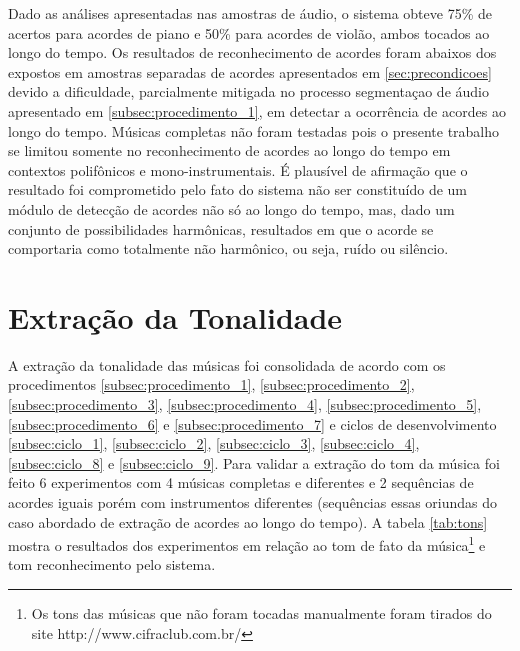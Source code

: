 Dado as análises apresentadas nas amostras de áudio, o sistema obteve 75\% de acertos para acordes de piano e 50\% para acordes de violão, ambos tocados ao longo do tempo. Os resultados de reconhecimento de acordes foram abaixos dos expostos em amostras separadas de acordes apresentados em \ref{sec:precondicoes} devido a dificuldade, parcialmente mitigada no processo segmentaçao de áudio apresentado em \ref{subsec:procedimento_1}, em detectar a ocorrência de acordes ao longo do tempo. Músicas completas não foram testadas pois o presente trabalho se limitou somente no reconhecimento de acordes ao longo do tempo em contextos polifônicos e mono-instrumentais. É plausível de afirmação que o resultado foi comprometido pelo fato do sistema não ser constituído de um módulo de detecção de acordes não só ao longo do tempo, mas, dado um conjunto de possibilidades harmônicas, resultados em que o acorde se comportaria como totalmente não harmônico, ou seja, ruído ou silêncio.

\section{Extração da Tonalidade}

A extração da tonalidade das músicas foi consolidada de acordo com os procedimentos \ref{subsec:procedimento_1}, \ref{subsec:procedimento_2}, \ref{subsec:procedimento_3}, \ref{subsec:procedimento_4}, \ref{subsec:procedimento_5}, \ref{subsec:procedimento_6} e \ref{subsec:procedimento_7} e ciclos de desenvolvimento \ref{subsec:ciclo_1}, \ref{subsec:ciclo_2}, \ref{subsec:ciclo_3}, \ref{subsec:ciclo_4}, \ref{subsec:ciclo_8} e \ref{subsec:ciclo_9}. Para validar a extração do tom da música foi feito 6 experimentos com 4 músicas completas e diferentes e 2 sequências de acordes iguais porém com instrumentos diferentes (sequências essas oriundas do caso abordado de extração de acordes ao longo do tempo). A tabela \ref{tab:tons} mostra o resultados dos experimentos em relação ao tom de fato da música\footnote{Os tons das músicas que não foram tocadas manualmente foram tirados do site http://www.cifraclub.com.br/} e tom reconhecimento pelo sistema.

